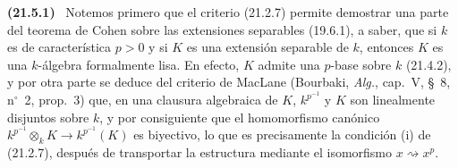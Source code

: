 \documentclass[10pt,oneside]{book}
\makeatletter
\newcommand{\setmanualcurrentlabel}[1]{\def\@currentlabel{#1}}
\newenvironment{env}[1][]{\setmanualcurrentlabel{#1}\par\medskip\noindent\textbf{(#1)}\ }{\par}
\makeatother
\begin{document}
\begin{env}[21.5.1]
\label{0.21.5.1-es}
Notemos primero que el criterio (21.2.7) permite demostrar una parte del
teorema de Cohen sobre las extensiones separables (19.6.1), a saber, que si $k$
es de característica $p>0$ y si $K$ es una extensión separable de $k$,
entonces $K$ es una $k$-álgebra formalmente lisa. En efecto, $K$ admite una
$p$-base sobre $k$ (21.4.2), y por otra parte se deduce del criterio de MacLane
(Bourbaki, \emph{Alg.}, cap.~V, §~8, n$^\circ$~2, prop.~3) que, en una
clausura algebraica de $K$, $k^{p^{-1}}$ y $K$ son linealmente disjuntos sobre
$k$, y por consiguiente que el homomorfismo canónico
$k^{p^{-1}}\otimes_k K\to k^{p^{-1}}(K)$ es biyectivo, lo que es precisamente
la condición (i) de (21.2.7), después de transportar la estructura mediante el
isomorfismo $x\rightsquigarrow x^p$.
\end{env}
\end{document}
